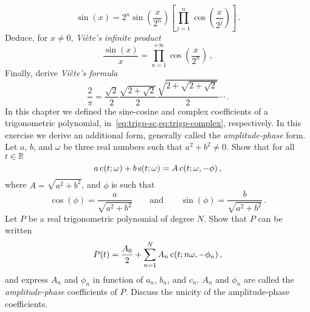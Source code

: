\begin{ExerciseList}
  \begin{equation}
    \sin(x)=2^n\sin\left(\frac{x}{2^n}\right)\left[\prod_{j=1}^n\cos\left(\frac{x}{2^j}\right)\right]\,.
  \end{equation}
  \Question Deduce, for $x\neq 0$, \emph{Viète's infinite product}
  \begin{equation}
    \frac{\sin(x)}{x}=\prod_{n=1}^{+\infty}\cos\left(\frac{x}{2^n}\right)\,,
  \end{equation}
  \Question Finally, derive \emph{Viète's formula}
  \begin{equation}
    \frac{2}{\pi}=\frac{\sqrt{2}}{2}\frac{\sqrt{2+\sqrt{2}}}{2}\frac{\sqrt{2+\sqrt{2+\sqrt{2}}
    }}{2}\cdots\,.
  \end{equation}
  \Exercise[label=ampphase]
  In this chapter we defined the sine-cosine and complex coefficients of a trigonometric polynomial,
  in~\cref{eq:trigp-sc,eq:trigp-complex}, respectively. In this exercise we derive an additional form, generally called the \emph{amplitude-phase} form.
  \Question Let $a$, $b$, and $\omega$ be three real numbers such that $a^2+b^2\neq0$. Show that for all $t\in\mathbb{R}$
  \begin{equation}
    a\operatorname{c}(t;\omega)+b\operatorname{s}(t;\omega)=A\operatorname{c}(t;\omega,-\phi)\,,
  \end{equation}
  where $A=\sqrt{a^2+b^2}$, and $\phi$ is such that
  \begin{equation}
    \cos(\phi)=\frac{a}{\sqrt{a^2+b^2}}\qquad\text{and}\qquad
    \sin(\phi)=\frac{b}{\sqrt{a^2+b^2}}\,.
  \end{equation}
  \Question Let $P$ be a real trigonometric polynomial of degree $N$. Show that $P$ can be written
  \begin{equation}
    P(t)=\frac{A_0}{2}+\sum_{n=1}^NA_n\operatorname{c}(t;n\omega,-\phi_n)\,,
  \end{equation}
  and express $A_n$ and $\phi_n$ in function of $a_n$, $b_n$, and $c_n$. $A_n$ and $\phi_n$ are called the \emph{amplitude-phase} coefficients of $P$.
  \Question Discuss the unicity of the amplitude-phase coefficients.
\end{ExerciseList}
